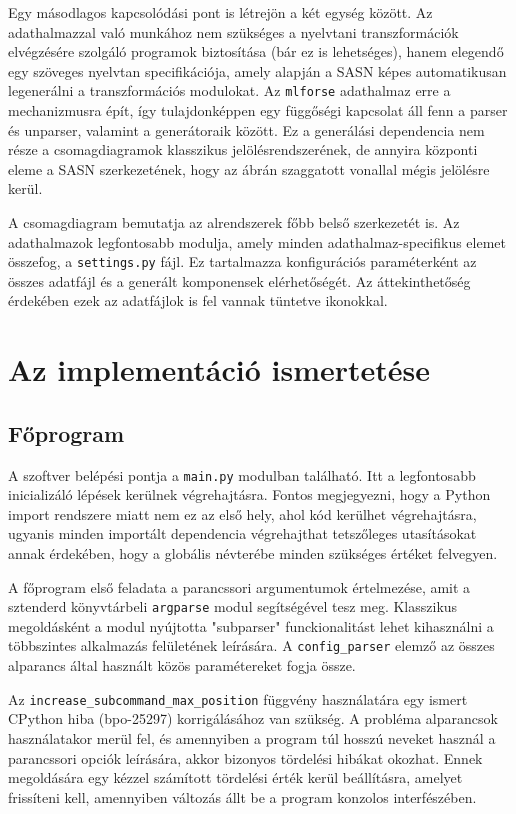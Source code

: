 \documentclass[twoside, 12pt]{report}
\begin{document}
Egy másodlagos kapcsolódási pont is létrejön a két egység között. Az adathalmazzal való munkához nem szükséges a nyelvtani transzformációk elvégzésére szolgáló programok biztosítása (bár ez is lehetséges), hanem elegendő egy szöveges nyelvtan specifikációja, amely alapján a SASN képes automatikusan legenerálni a transzformációs modulokat. Az \verb|mlforse| adathalmaz erre a mechanizmusra épít, így tulajdonképpen egy függőségi kapcsolat áll fenn a parser és unparser, valamint a generátoraik között. Ez a generálási dependencia nem része a csomagdiagramok klasszikus jelölésrendszerének, de annyira központi eleme a SASN szerkezetének, hogy az ábrán szaggatott vonallal mégis jelölésre kerül.

A csomagdiagram bemutatja az alrendszerek főbb belső szerkezetét is. Az adathalmazok legfontosabb modulja, amely minden adathalmaz-specifikus elemet összefog, a \verb|settings.py| fájl. Ez tartalmazza konfigurációs paraméterként az összes adatfájl és a generált komponensek elérhetőségét. Az áttekinthetőség érdekében ezek az adatfájlok is fel vannak tüntetve ikonokkal.

\section{Az implementáció ismertetése}

\subsection{Főprogram}

A szoftver belépési pontja a \verb|main.py| modulban található. Itt a legfontosabb inicializáló lépések kerülnek végrehajtásra. Fontos megjegyezni, hogy a Python import rendszere miatt nem ez az első hely, ahol kód kerülhet végrehajtásra, ugyanis minden importált dependencia végrehajthat tetszőleges utasításokat annak érdekében, hogy a globális névterébe minden szükséges értéket felvegyen.

A főprogram első feladata a parancssori argumentumok értelmezése, amit a sztenderd könyvtárbeli \verb|argparse| modul segítségével tesz meg. Klasszikus megoldásként a modul nyújtotta "subparser" funckionalitást lehet kihasználni a többszintes alkalmazás felületének leírására. A \verb|config_parser| elemző az összes alparancs által használt közös paramétereket fogja össze.

Az \verb|increase_subcommand_max_position| függvény használatára egy ismert CPython hiba (bpo-25297) korrigálásához van szükség. A probléma alparancsok használatakor merül fel, és amennyiben a program túl hosszú neveket használ a parancssori opciók leírására, akkor bizonyos tördelési hibákat okozhat. Ennek megoldására egy kézzel számított tördelési érték kerül beállításra, amelyet frissíteni kell, amennyiben változás állt be a program konzolos interfészében.
\end{document}
